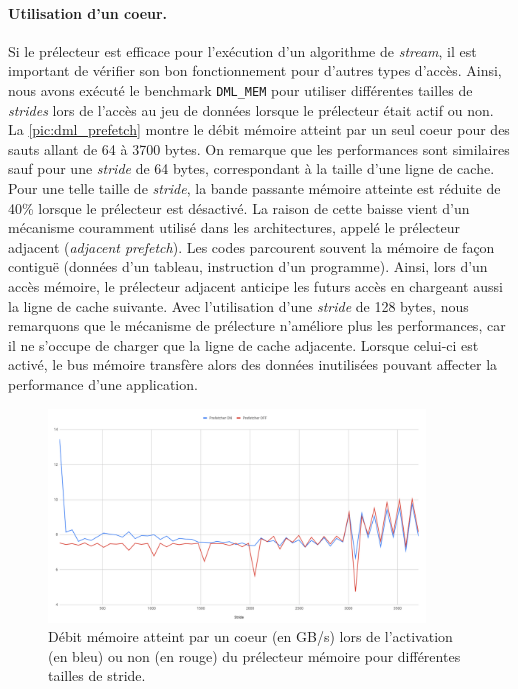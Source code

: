         \paragraph{Utilisation d'un coeur.}
            Si le prélecteur est efficace pour l'exécution d'un algorithme de \textit{stream}, il est important de vérifier son bon fonctionnement pour d'autres types d'accès. Ainsi, nous avons exécuté le benchmark \verb=DML_MEM= pour utiliser différentes tailles de \textit{strides} lors de l'accès au jeu de données lorsque le prélecteur était actif ou non. La \autoref{pic:dml_prefetch} montre le débit mémoire atteint par un seul coeur  pour des sauts allant de 64 à 3700 bytes. On remarque que les performances sont similaires sauf pour une \textit{stride} de 64 bytes, correspondant à la taille d'une ligne de cache. Pour une telle taille de \textit{stride}, la bande passante mémoire atteinte est réduite de 40\% lorsque le prélecteur est désactivé. La raison de cette baisse vient d'un mécanisme couramment utilisé dans les architectures, appelé le prélecteur adjacent (\textit{adjacent prefetch}). Les codes parcourent souvent la mémoire de façon contiguë (données d'un tableau, instruction d'un programme). Ainsi, lors d'un accès mémoire, le prélecteur adjacent anticipe les futurs accès en chargeant aussi la ligne de cache suivante. Avec l'utilisation d'une \textit{stride} de 128 bytes, nous remarquons que le mécanisme de prélecture n'améliore plus les performances, car il ne s'occupe de charger que la ligne de cache adjacente. Lorsque celui-ci est activé, le bus mémoire transfère alors des données inutilisées pouvant affecter la performance d'une application.
            
            
        
        \begin{figure}
        \center
        \includegraphics[width=10cm]{images/dml_prefetch.png}
        \caption{\label{pic:dml_prefetch} Débit mémoire atteint par un coeur (en GB/s) lors de l'activation (en bleu) ou non (en rouge) du prélecteur mémoire pour différentes tailles de stride. }
        \end{figure}
        
